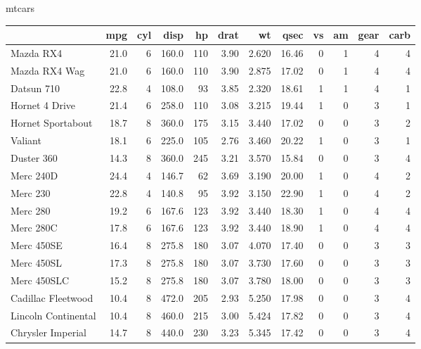 \documentclass[
]{book}
\newenvironment{Shaded}{\begin{snugshade}}{\end{snugshade}}
\newcommand{\NormalTok}[1]{#1}
\theoremstyle{definition}
\theoremstyle{definition}
\theoremstyle{definition}
\theoremstyle{definition}
\theoremstyle{remark}
\begin{document}
\begin{Shaded}
\begin{Highlighting}[]
\NormalTok{mtcars}
\end{Highlighting}
\end{Shaded}

\begin{tabular}{l|r|r|r|r|r|r|r|r|r|r|r}
\hline
  & mpg & cyl & disp & hp & drat & wt & qsec & vs & am & gear & carb\\
\hline
Mazda RX4 & 21.0 & 6 & 160.0 & 110 & 3.90 & 2.620 & 16.46 & 0 & 1 & 4 & 4\\
\hline
Mazda RX4 Wag & 21.0 & 6 & 160.0 & 110 & 3.90 & 2.875 & 17.02 & 0 & 1 & 4 & 4\\
\hline
Datsun 710 & 22.8 & 4 & 108.0 & 93 & 3.85 & 2.320 & 18.61 & 1 & 1 & 4 & 1\\
\hline
Hornet 4 Drive & 21.4 & 6 & 258.0 & 110 & 3.08 & 3.215 & 19.44 & 1 & 0 & 3 & 1\\
\hline
Hornet Sportabout & 18.7 & 8 & 360.0 & 175 & 3.15 & 3.440 & 17.02 & 0 & 0 & 3 & 2\\
\hline
Valiant & 18.1 & 6 & 225.0 & 105 & 2.76 & 3.460 & 20.22 & 1 & 0 & 3 & 1\\
\hline
Duster 360 & 14.3 & 8 & 360.0 & 245 & 3.21 & 3.570 & 15.84 & 0 & 0 & 3 & 4\\
\hline
Merc 240D & 24.4 & 4 & 146.7 & 62 & 3.69 & 3.190 & 20.00 & 1 & 0 & 4 & 2\\
\hline
Merc 230 & 22.8 & 4 & 140.8 & 95 & 3.92 & 3.150 & 22.90 & 1 & 0 & 4 & 2\\
\hline
Merc 280 & 19.2 & 6 & 167.6 & 123 & 3.92 & 3.440 & 18.30 & 1 & 0 & 4 & 4\\
\hline
Merc 280C & 17.8 & 6 & 167.6 & 123 & 3.92 & 3.440 & 18.90 & 1 & 0 & 4 & 4\\
\hline
Merc 450SE & 16.4 & 8 & 275.8 & 180 & 3.07 & 4.070 & 17.40 & 0 & 0 & 3 & 3\\
\hline
Merc 450SL & 17.3 & 8 & 275.8 & 180 & 3.07 & 3.730 & 17.60 & 0 & 0 & 3 & 3\\
\hline
Merc 450SLC & 15.2 & 8 & 275.8 & 180 & 3.07 & 3.780 & 18.00 & 0 & 0 & 3 & 3\\
\hline
Cadillac Fleetwood & 10.4 & 8 & 472.0 & 205 & 2.93 & 5.250 & 17.98 & 0 & 0 & 3 & 4\\
\hline
Lincoln Continental & 10.4 & 8 & 460.0 & 215 & 3.00 & 5.424 & 17.82 & 0 & 0 & 3 & 4\\
\hline
Chrysler Imperial & 14.7 & 8 & 440.0 & 230 & 3.23 & 5.345 & 17.42 & 0 & 0 & 3 & 4\\

\end{tabular}
\end{document}
